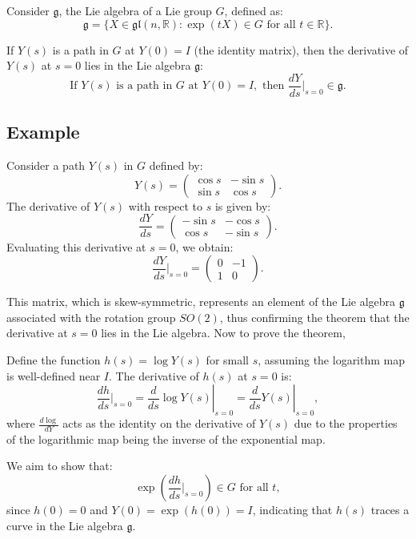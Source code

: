 \documentclass{article}
\begin{document}
Consider \(\mathfrak{g}\), the Lie algebra of a Lie group \(G\), defined as:
\[
\mathfrak{g} = \{X \in \mathfrak{gl}(n, \mathbb{R}) : \exp(tX) \in G \text{ for all } t \in \mathbb{R}\}.
\]

\begin{theorem}
If \( Y(s) \) is a path in \( G \) at \( Y(0) = I \) (the identity matrix), then the derivative of \( Y(s) \) at \( s = 0 \) lies in the Lie algebra \(\mathfrak{g}\):
\[
\text{If } Y(s) \text{ is a path in } G \text{ at } Y(0) = I, \text{ then } \frac{dY}{ds}\bigg|_{s=0} \in \mathfrak{g}.
\]    
\end{theorem}

\subsection*{Example}
Consider a path \( Y(s) \) in \( G \) defined by:
\[
Y(s) = \begin{pmatrix} \cos s & -\sin s \\ \sin s & \cos s \end{pmatrix}.
\]
The derivative of \( Y(s) \) with respect to \( s \) is given by:
\[
\frac{dY}{ds} = \begin{pmatrix} -\sin s & -\cos s \\ \cos s & -\sin s \end{pmatrix}.
\]
Evaluating this derivative at \( s = 0 \), we obtain:
\[
\frac{dY}{ds}\bigg|_{s=0} = \begin{pmatrix} 0 & -1 \\ 1 & 0 \end{pmatrix}.
\]

This matrix, which is skew-symmetric, represents an element of the Lie algebra \(\mathfrak{g}\) associated with the rotation group \(SO(2)\), thus confirming the theorem that the derivative at \(s = 0\) lies in the Lie algebra.
Now to prove the theorem, 

Define the function \( h(s) = \log Y(s) \) for small \(s\), assuming the logarithm map is well-defined near \(I\). The derivative of \(h(s)\) at \(s=0\) is:
\[
\frac{dh}{ds}\bigg|_{s=0} = \left. \frac{d}{ds} \log Y(s) \right|_{s=0} = \left. \frac{d}{ds} Y(s) \right|_{s=0},
\]
where \( \frac{d\log}{dY} \) acts as the identity on the derivative of \(Y(s)\) due to the properties of the logarithmic map being the inverse of the exponential map.

We aim to show that:
\[
\exp\left( \frac{dh}{ds}\bigg|_{s=0} \right) \in G \text{ for all } t,
\]
since \( h(0) = 0 \) and \( Y(0) = \exp(h(0)) = I \), indicating that \( h(s) \) traces a curve in the Lie algebra \(\mathfrak{g}\).
\end{document}
